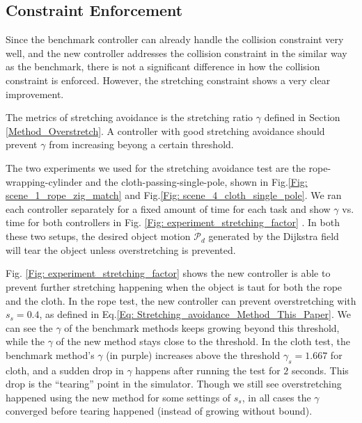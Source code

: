 

\subsection{Constraint Enforcement}
\label{Results: Object Stretching Avoidance}

Since the benchmark controller can already handle the collision constraint very well, and the new controller addresses the collision constraint in the similar way as the benchmark, there is not a significant difference in how the collision constraint is enforced. However, the stretching constraint shows a very clear improvement.

The metrics of stretching avoidance is the stretching ratio $\gamma$ defined in Section \ref{Method_Overstretch}. A controller with good stretching avoidance should prevent $\gamma$ from increasing beyong a certain threshold.

The two experiments we used for the stretching avoidance test are the rope-wrapping-cylinder and the cloth-passing-single-pole, shown in Fig.\ref{Fig: scene_1_rope_zig_match} and Fig.\ref{Fig: scene_4_cloth_single_pole}. 
We ran each controller separately for a fixed amount of time for each task and show $\gamma$ vs. time for both controllers in Fig. \ref{Fig: experiment_stretching_factor} . 
In both these two setups, the desired object motion $\dot{\mathcal{P}}_d$ generated by the Dijkstra field will tear the object unless overstretching is prevented.%

Fig. \ref{Fig: experiment_stretching_factor} shows the new controller is able to prevent further stretching happening when the object is taut for both the rope and the cloth. 
In the rope test, the new controller can prevent overstretching with $s_s = 0.4$, as defined in Eq.\ref{Eq: Stretching_avoidance_Method_This_Paper}. 
We can see the $\gamma$ of the benchmark methods keeps growing beyond this threshold, while the $\gamma$ of the new method stays close to the threshold. In the cloth test, the benchmark method's $\gamma$ (in purple) increases above the threshold $\gamma_s = 1.667$ for cloth, and a sudden drop in $\gamma$ happens after running the test for $2$ seconds. This drop is the ``tearing'' point in the simulator. Though we still see overstretching happened using the new method for some settings of $s_s$, in all cases the $\gamma$ converged before tearing happened (instead of growing without bound). 


